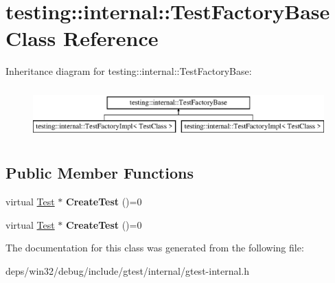 \hypertarget{classtesting_1_1internal_1_1_test_factory_base}{}\section{testing\+:\+:internal\+:\+:Test\+Factory\+Base Class Reference}
\label{classtesting_1_1internal_1_1_test_factory_base}
Inheritance diagram for testing\+:\+:internal\+:\+:Test\+Factory\+Base\+:\begin{figure}[H]
\begin{center}
\leavevmode
\includegraphics[height=2.000000cm]{classtesting_1_1internal_1_1_test_factory_base}
\end{center}
\end{figure}
\subsection*{Public Member Functions}
\begin{DoxyCompactItemize}
\item 
\hypertarget{classtesting_1_1internal_1_1_test_factory_base_a07ac3ca0b196cdb092da0bb186b7c030}{}virtual \hyperlink{classtesting_1_1_test}{Test} $\ast$ {\bfseries Create\+Test} ()=0\label{classtesting_1_1internal_1_1_test_factory_base_a07ac3ca0b196cdb092da0bb186b7c030}

\item 
\hypertarget{classtesting_1_1internal_1_1_test_factory_base_a07ac3ca0b196cdb092da0bb186b7c030}{}virtual \hyperlink{classtesting_1_1_test}{Test} $\ast$ {\bfseries Create\+Test} ()=0\label{classtesting_1_1internal_1_1_test_factory_base_a07ac3ca0b196cdb092da0bb186b7c030}

\end{DoxyCompactItemize}


The documentation for this class was generated from the following file\+:\begin{DoxyCompactItemize}
\item 
deps/win32/debug/include/gtest/internal/gtest-\/internal.\+h\end{DoxyCompactItemize}
